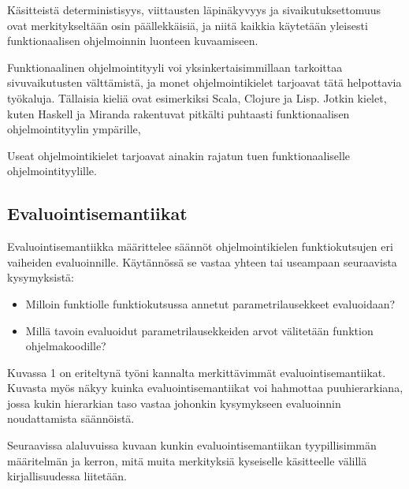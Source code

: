 Käsitteistä deterministisyys, viittausten läpinäkyvyys ja sivaikutuksettomuus ovat merkitykseltään osin päällekkäisiä, ja niitä kaikkia käytetään yleisesti funktionaalisen ohjelmoinnin luonteen kuvaamiseen.

Funktionaalinen ohjelmointityyli voi yksinkertaisimmillaan tarkoittaa sivuvaikutusten välttämistä, ja monet ohjelmointikielet tarjoavat tätä helpottavia työkaluja. Tällaisia kieliä ovat esimerkiksi Scala, Clojure ja Lisp. Jotkin kielet, kuten Haskell ja Miranda rakentuvat pitkälti puhtaasti funktionaalisen ohjelmointityylin ympärille, 

Useat ohjelmointikielet tarjoavat ainakin rajatun tuen funktionaaliselle ohjelmointityylille. 

\subsection{Evaluointisemantiikat}

Evaluointisemantiikka määrittelee säännöt ohjelmointikielen funktiokutsujen eri vaiheiden evaluoinnille. Käytännössä se vastaa yhteen tai useampaan seuraavista kysymyksistä:

\begin{itemize}
    \item Milloin funktiolle funktiokutsussa annetut parametrilausekkeet evaluoidaan?
    \item Millä tavoin evaluoidut parametrilausekkeiden arvot välitetään funktion ohjelmakoodille?
\end{itemize}

Kuvassa 1 on eriteltynä työni kannalta merkittävimmät evaluointisemantiikat. Kuvasta myös näkyy kuinka evaluointisemantiikat voi hahmottaa puuhierarkiana, jossa kukin hierarkian taso vastaa johonkin kysymykseen evaluoinnin noudattamista säännöistä.

Seuraavissa alaluvuissa kuvaan kunkin evaluointisemantiikan tyypillisimmän määritelmän ja kerron, mitä muita merkityksiä kyseiselle käsitteelle välillä kirjallisuudessa liitetään.


